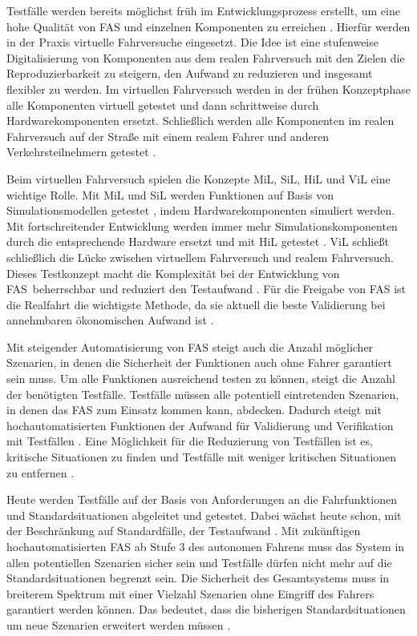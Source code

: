 Testfälle werden bereits möglichst früh im Entwicklungsprozess erstellt, um eine hohe Qualität von \ac{FAS} und einzelnen Komponenten zu erreichen \cite{wachenfeld2015freigabe}. Hierfür werden in der Praxis virtuelle Fahrversuche eingesetzt. Die Idee ist eine stufenweise Digitalisierung von Komponenten aus dem realen Fahrversuch mit den Zielen die Reproduzierbarkeit zu steigern, den Aufwand zu reduzieren und insgesamt flexibler zu werden. Im virtuellen Fahrversuch werden in der frühen Konzeptphase alle Komponenten virtuell getestet und dann schrittweise durch Hardwarekomponenten ersetzt. Schließlich werden alle Komponenten im realen Fahrversuch auf der Straße mit einem realem Fahrer und anderen Verkehrsteilnehmern getestet \cite{hakuli2015virtuelle}.

Beim virtuellen Fahrversuch spielen die Konzepte \ac{MiL}, \ac{SiL}, \ac{HiL} und \ac{ViL} eine wichtige Rolle. Mit \ac{MiL} und \ac{SiL} werden Funktionen auf Basis von Simulationsmodellen getestet \cite{berg2015vehicle}, indem Hardwarekomponenten simuliert werden. Mit fortschreitender Entwicklung werden immer mehr Simulationskomponenten durch die entsprechende Hardware ersetzt und mit \ac{HiL} getestet \cite{hakuli2015virtuelle}. \ac{ViL} schließt schließlich die Lücke zwischen virtuellem Fahrversuch und realem Fahrversuch. Dieses Testkonzept macht die Komplexität bei der Entwicklung von \ac{FAS} beherrschbar und reduziert den Testaufwand \cite{schwab2014durchgangige}. Für die Freigabe von \ac{FAS} ist die Realfahrt die wichtigste Methode, da sie aktuell die beste Validierung bei annehmbaren ökonomischen Aufwand ist \cite{wachenfeld2015freigabe}.

Mit steigender Automatisierung von \ac{FAS} steigt auch die Anzahl möglicher Szenarien, in denen die Sicherheit der Funktionen auch ohne Fahrer garantiert sein muss. Um alle Funktionen ausreichend testen zu können, steigt die Anzahl der benötigten Testfälle. Testfälle müssen alle potentiell eintretenden Szenarien, in denen das \ac{FAS} zum Einsatz kommen kann, abdecken. Dadurch steigt mit hochautomatisierten Funktionen der Aufwand für Validierung und Verifikation mit Testfällen \cite{bach2017reactive}. Eine Möglichkeit für die Reduzierung von Testfällen ist es, kritische Situationen zu finden und Testfälle mit weniger kritischen Situationen zu entfernen \cite{wachenfeld2015freigabe}.

Heute werden Testfälle auf der Basis von Anforderungen an die Fahrfunktionen und Standardsituationen abgeleitet und getestet. Dabei wächst heute schon, mit der Beschränkung auf Standardfälle, der Testaufwand \cite{surmund2018neue}. Mit zukünftigen hochautomatisierten \ac{FAS} ab Stufe 3 des autonomen Fahrens muss das System in allen potentiellen Szenarien sicher sein und Testfälle dürfen nicht mehr auf die Standardsituationen begrenzt sein. Die Sicherheit des Gesamtsystems muss in breiterem Spektrum mit einer Vielzahl Szenarien ohne Eingriff des Fahrers garantiert werden können. Das bedeutet, dass die bisherigen Standardsituationen um neue Szenarien erweitert werden müssen \cite{surmund2018neue}.

